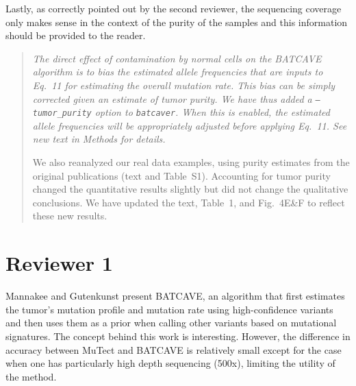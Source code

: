 \documentclass[11pt]{article}
\newenvironment{response}
{\begin{quote}\itshape}
{\end{quote}}
\begin{document}
Lastly, as correctly pointed out by the second reviewer, the sequencing coverage only makes sense in the context of the purity of the samples and this information should be provided to the reader.
\begin{response}
The direct effect of contamination by normal cells on the BATCAVE algorithm is to bias the estimated allele frequencies that are inputs to Eq.~11 for estimating the overall mutation rate.
This bias can be simply corrected given an estimate of tumor purity.
We have thus added a \texttt{--tumor\_purity} option to \texttt{batcaver}.
When this is enabled, the estimated allele frequencies will be appropriately adjusted before applying Eq.~11.
See new text in Methods for details.

We also reanalyzed our real data examples, using purity estimates from the original publications (text and Table~S1).
Accounting for tumor purity changed the quantitative results slightly but did not change the qualitative conclusions.
We have updated the text, Table~1, and Fig.~4E\&F to reflect these new results.
 
\end{response}


\section*{Reviewer 1}

Mannakee and Gutenkunst present BATCAVE, an algorithm that first estimates the tumor’s mutation profile and mutation rate using high-confidence variants and then uses them as a prior when calling other variants based on mutational signatures. The concept behind this work is interesting. However, the difference in accuracy between MuTect and BATCAVE is relatively small except for the case when one has particularly high depth sequencing (500x), limiting the utility of the method. 
\end{document}
